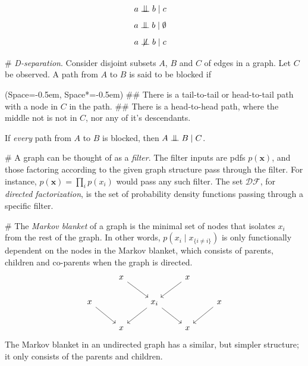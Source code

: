 \documentclass[12pt, a4paper]{article}
\newcommand{\listSpace}{-0.5em}%
\newcommand{\vect}[1]{\bm{#1}}
\newcommand{\bigCI}{\mathrel{\text{\scalebox{1.07}{$\perp\mkern-10mu\perp$}}}}
\newcommand{\nbigCI}{\centernot{\bigCI}}
\begin{document}
\begin{easylist}[itemize]
\begin{figure}[!htb]
	\begin{align*}
	a \bigCI b &\mid c
	\end{align*}
	\endminipage
	\begin{align*}
	a \bigCI b &\mid \emptyset 
	\end{align*}
	\begin{align*}
	a \nbigCI b &\mid c
	\end{align*}
	\endminipage
\end{figure}

# \emph{D-separation}. Consider disjoint subsets $A$, $B$ and $C$ of edges in a graph. 
Let $C$ be observed.
A path from $A$ to $B$ is said to be blocked if
\begin{easylist}[itemize]
	\ListProperties(Space=\listSpace, Space*=\listSpace)
## There is a tail-to-tail or head-to-tail path with a node in $C$ in the path.
## There is a head-to-head path, where the middle not is not in $C$, nor any of it's descendants.
\end{easylist}
If \emph{every} path from $A$ to $B$ is blocked, then $A \bigCI B \mid C$.

# A graph can be thought of as a \emph{filter}.
The filter inputs are pdfs $p(\vect{x})$, and those factoring according to the given graph structure pass through the filter.
For instance, $p(\vect{x}) = \prod_{i} p(x_i)$ would pass any such filter.
The set $\mathcal{DF}$, for \emph{directed factorization}, is the set of probability density functions passing through a specific filter.

# The \emph{Markov blanket} of a graph is the minimal set of nodes that isolates $x_i$ from the rest of the graph.
In other words, $p( x_i \mid x_{\{ i \neq i\}})$ is only functionally dependent on the nodes in the Markov blanket, which consists of parents, children and co-parents when the graph is directed.
\begin{equation*}
	\begin{tikzcd}
	  & x \arrow{dr} &   & x \arrow{dl} &    \\
	x  \arrow{dr} &   & x_i \arrow{dr} \arrow{dl} &   & x \arrow{dl} \\
	  & x &   & x &  
	\end{tikzcd}
\end{equation*}
The Markov blanket in an undirected graph has a similar, but simpler structure; it only consists of the parents and children.
\end{easylist}
\end{document}
